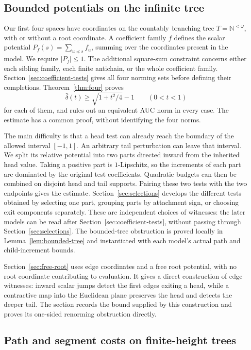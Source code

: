 \subsection*{Bounded potentials on the infinite tree}

Our first four spaces have coordinates on the countably branching
tree $T=\mathbb N^{<\omega}$, with or without a root coordinate.
A coefficient family $f$ defines the scalar potential
$P_f(s)=\sum_{u\preceq s}f_u$, summing over the coordinates present
in the model. We require $|P_f|\le1$. The additional square-sum
constraint concerns either each sibling family, each finite antichain,
or the whole coefficient family. Section~\ref{sec:coefficient-tests}
gives all four norming sets before defining their completions.
Theorem~\ref{thm:four} proves
\[
 \widehat\delta(t)\ge\sqrt{1+t^2/4}-1\qquad(0<t<1)
\]
for each of them, and rules out an equivalent AUC norm in every case.
The estimate has a common proof, without identifying the four norms.

The main difficulty is that a head test can already reach the boundary
of the allowed interval $[-1,1]$. An arbitrary tail perturbation can
leave that interval. We split its relative potential into two parts
directed inward from the inherited head value. Taking a positive part
is $1$-Lipschitz, so the increments of each part are dominated by the
original test coefficients. Quadratic budgets can then be combined
on disjoint head and tail supports. Pairing these two tests with the
two endpoints gives the estimate. Section~\ref{sec:selections}
develops the different tests obtained by selecting one part, grouping
parts by attachment sign, or choosing exit components separately.
These are independent choices of witnesses: the later models can be
read after Section~\ref{sec:coefficient-tests}, without passing through
Section~\ref{sec:selections}.
The bounded-tree obstruction is proved locally in
Lemma~\ref{lem:bounded-tree} and instantiated with each model's
actual path and child-increment bounds.

Section~\ref{sec:free-root} uses edge coordinates and a free root
potential, with no root coordinate contributing to evaluation. It gives
a direct construction of edge witnesses: inward scalar jumps detect the first edges exiting a head,
while a contractive map into the Euclidean plane preserves the head and
detects the deeper tail. The section records the bound supplied by this
construction and proves its one-sided renorming obstruction directly.

\subsection*{Path and segment costs on finite-height trees}

